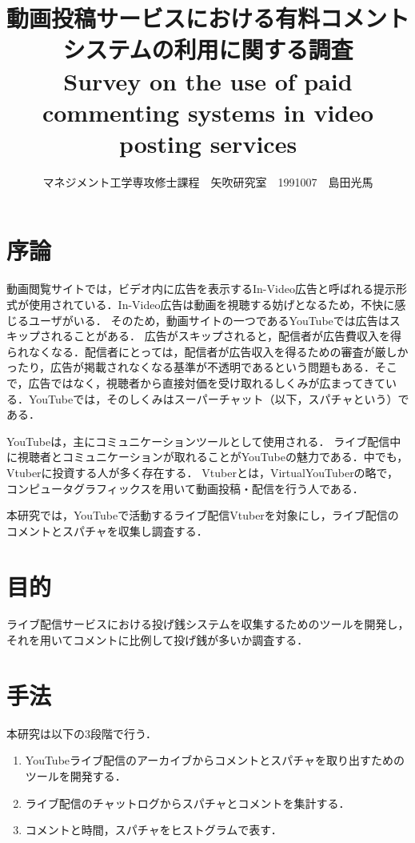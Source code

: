 \documentclass[uplatex,twocolumn,dvipdfmx,10pt]{jsarticle}
\title{\vspace{-5mm}\fontsize{14pt}{0pt}\selectfont 動画投稿サービスにおける有料コメントシステムの利用に関する調査\\
{\normalsize Survey on the use of paid commenting systems in video posting services}}
\author{\normalsize マネジメント工学専攻修士課程　矢吹研究室　1991007　島田光馬}
\date{}
\begin{document}
\maketitle


\section{序論}

動画閲覧サイトでは，ビデオ内に広告を表示するIn-Video広告と呼ばれる提示形式が使用されている．In-Video広告は動画を視聴する妨げとなるため，不快に感じるユーザがいる\cite{01}．
そのため，動画サイトの一つであるYouTubeでは広告はスキップされることがある．
広告がスキップされると，配信者が広告費収入を得られなくなる．配信者にとっては，配信者が広告収入を得るための審査が厳しかったり，広告が掲載されなくなる基準が不透明であるという問題もある．そこで，広告ではなく，視聴者から直接対価を受け取れるしくみが広まってきている．YouTubeでは，そのしくみはスーパーチャット（以下，スパチャという）である．

YouTubeは，主にコミュニケーションツールとして使用される\cite{02}．
ライブ配信中に視聴者とコミュニケーションが取れることがYouTubeの魅力である．中でも，Vtuberに投資する人が多く存在する．
Vtuberとは，VirtualYouTuberの略で，コンピュータグラフィックスを用いて動画投稿・配信を行う人である．

本研究では，YouTubeで活動するライブ配信Vtuberを対象にし，ライブ配信のコメントとスパチャを収集し調査する．


\section{目的}

ライブ配信サービスにおける投げ銭システムを収集するためのツールを開発し，それを用いてコメントに比例して投げ銭が多いか調査する．

\section{手法}

本研究は以下の3段階で行う．
\begin{enumerate}
 \item YouTubeライブ配信のアーカイブからコメントとスパチャを取り出すためのツールを開発する．
 \item ライブ配信のチャットログからスパチャとコメントを集計する．
 \item コメントと時間，スパチャをヒストグラムで表す．
\end{enumerate}
\end{document}
